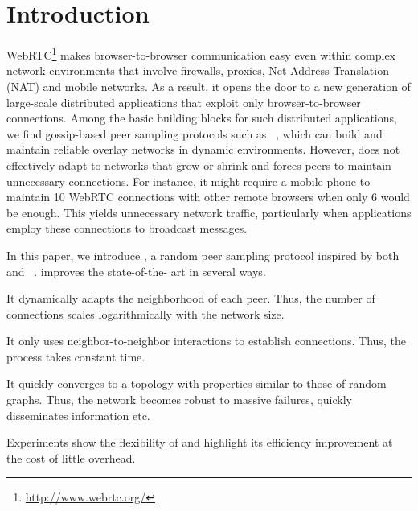 
\section{Introduction}


WebRTC\footnote{\url{http://www.webrtc.org/}} makes browser-to-browser
communication easy even within complex network environments that
involve firewalls, proxies, Net Address Translation (NAT) and mobile
networks. As a result, it opens the door to a new generation of
large-scale distributed applications that exploit only
browser-to-browser connections. Among the basic building blocks for
such distributed applications, we find gossip-based peer sampling
protocols such as \CYCLON~\cite{voulgaris2005cyclon}, which can build
and maintain reliable overlay networks in dynamic environments.
However, \CYCLON does not effectively adapt to networks that grow or
shrink and forces peers to maintain unnecessary connections.  For
instance, it might require a mobile phone to maintain 10 WebRTC
connections with other remote browsers when only 6 would be
enough. This yields unnecessary network traffic, particularly when
applications employ these connections to broadcast messages.

In this paper, we introduce \SPRAY, a random peer sampling protocol
inspired by both \SCAMP~\cite{ganesh2003peer} and
\CYCLON~\cite{voulgaris2005cyclon}. \SPRAY improves the state-of-the-
art in several ways. 
\begin{inparaenum}[(i)]
\item It dynamically adapts the neighborhood of each peer. Thus, the
  number of connections scales logarithmically with the network size.
\item It only uses neighbor-to-neighbor interactions to establish
  connections. Thus, the process takes constant time.
\item It quickly converges to a topology with properties similar to
  those of random graphs. Thus, the network becomes robust to massive
  failures, quickly disseminates information etc.
\item Experiments show the flexibility of \SPRAY and highlight its
  efficiency improvement at the cost of little overhead.
\end{inparaenum}

